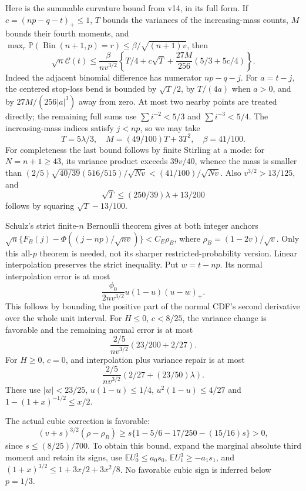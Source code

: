 \documentclass[11pt]{article}
\newcommand{\E}{\mathbb E}\newcommand{\Pp}{\mathbb P}
\begin{document}
Here is the summable curvature bound from v14, in its full form.
If $c=(np-q-t)_+\le1$, $T$ bounds the variances of the increasing-mass
counts, $M$ bounds their fourth moments, and
$\max_r\Pp(\operatorname{Bin}(n+1,p)=r)\le\beta/\sqrt{(n+1)v}$, then
\begin{equation}\label{eq:curvature}
 \sqrt n\mathcal C(t)\le\frac{\beta}{nv^{3/2}}
 \left\{T/4+c\sqrt T+\frac{27M}{256}(5/3+5c/4)\right\}.
\end{equation}
Indeed the adjacent binomial difference has numerator $np-q-j$.
For $a=t-j$, the centered stop-loss bend is bounded by $\sqrt T/2$,
by $T/(4a)$ when $a>0$, and by $27M/(256|a|^3)$ away from zero.
At most two nearby points are treated directly; the remaining full sums
use $\sum i^{-2}<5/3$ and $\sum i^{-3}<5/4$.
The increasing-mass indices satisfy $j<np$, so we may take
\[
 T=5\lambda/3,\quad M=(49/100)T+3T^2,\quad \beta=41/100.
\]
For completeness the last bound follows by finite Stirling at a mode:
for $N=n+1\ge43$, its variance product exceeds $39v/40$, whence the
mass is smaller than $(2/5)\sqrt{40/39}(516/515)/\sqrt{Nv}
<(41/100)/\sqrt{Nv}$. Also $v^{3/2}>13/125$, and
\[
                 \sqrt T\le(250/39)\lambda+13/200
\]
follows by squaring $\sqrt T-13/100$.

Schulz's strict finite-$n$ Bernoulli theorem gives at both integer anchors
$\sqrt n\{F_B(j)-\Phi((j-np)/\sqrt{nv})\}<C_E\rho_B$, where
$\rho_B=(1-2v)/\sqrt v$. Only this all-$p$ theorem is needed, not its
sharper restricted-probability version. Linear interpolation preserves
the strict inequality. Put $w=t-np$. Its normal interpolation error is at most
\[
 \frac{\phi_0}{2nv^{3/2}}u(1-u)(u-w)_+.
\]
This follows by bounding the positive part of the normal CDF's second
derivative over the whole unit interval.
For $H\le0$, $c<8/25$, the variance change is favorable and the remaining
normal error is at most
\[
                  \frac{2/5}{nv^{3/2}}(23/200+2/27).
\]
For $H\ge0$, $c=0$, and interpolation plus variance repair is at most
\[
                  \frac{2/5}{nv^{3/2}}(2/27+(23/50)\lambda).
\]
These use $|w|<23/25$, $u(1-u)\le1/4$, $u^2(1-u)\le4/27$ and
$1-(1+x)^{-1/2}\le x/2$.

The actual cubic correction is favorable:
\[
 (v+s)^{3/2}(\rho-\rho_B)
 \ge s\{1-5/6-17/250-(15/16)s\}>0,
\]
since $s\le(8/25)/700$. To obtain this bound, expand the marginal absolute
third moment and retain its signs, use
$\E U_0^3\le a_0s_0$, $\E U_1^3\ge-a_1s_1$, and
$(1+x)^{3/2}\le1+3x/2+3x^2/8$. No favorable cubic sign is inferred
below $p=1/3$.
\end{document}

